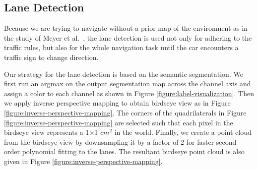 \subsection{Lane Detection}

Because we are trying to navigate without a prior map of the environment as in
the study of Meyer et al.\ \cite{Meyer2018DeepSL}, the lane detection is used
not only for adhering to the traffic rules, but also for the whole navigation
task until the car encounters a traffic sign to change direction.

Our strategy for the lane detection is based on the semantic segmentation. We
first run an argmax on the output segmentation map across the channel axis and
assign a color to each channel as shown in Figure
\ref{figure:label-visualization}. Then we apply inverse perspective mapping to
obtain birdseye view as in Figure \ref{figure:inverse-perspective-mapping}.
The corners of the quadrilaterals in Figure
\ref{figure:inverse-perspective-mapping} are selected such that each pixel in
the birdseye view represents a 1$\times$1 $cm^2$ in the world. Finally, we
create a point cloud from the birdseye view by downsampling it by a factor of 2
for faster second order polynomial fitting to the lanes. The resultant birdseye
point cloud is also given in Figure \ref{figure:inverse-perspective-mapping}.

